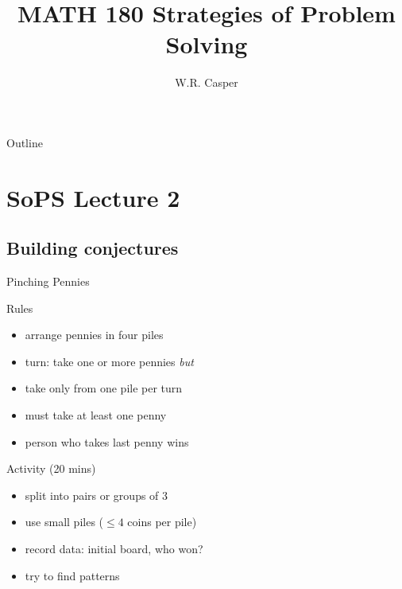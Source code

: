 \documentclass{beamer}
\title{MATH 180 Strategies of Problem Solving}
\subtitle
{} %
\author[W.R. Casper] %
{W.R. Casper}
\institute[California State University Fullerton] %
{
  Department of Mathematics\\
  California State University Fullerton}
\begin{document}
\begin{frame}
  \titlepage
\end{frame}

\begin{frame}{Outline}
  \tableofcontents
\end{frame}



\section{SoPS Lecture 2}
\subsection{Building conjectures}

\begin{frame}{Pinching Pennies}
  \begin{block}{Rules}
    \begin{itemize}
      \item arrange pennies in four piles
      \item turn: take one or more pennies \emph{but}
      \item take only from one pile per turn
      \item must take at least one penny
      \item person who takes last penny wins
    \end{itemize}
  \end{block}
\pause
  \begin{block}{Activity (20 mins)}
    \begin{itemize}
\pause
      \item split into pairs or groups of 3
\pause
      \item use small piles ($\leq 4$ coins per pile)
\pause
      \item {\color{red}record data:} initial board, who won? 
\pause
      \item try to find {\color{blue}patterns}
    \end{itemize}
  \end{block}
\end{frame}
\end{document}

